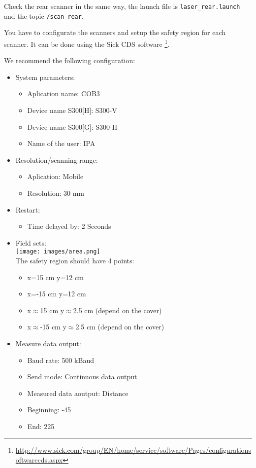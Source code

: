 Check the rear scanner in the same way, the launch file is \texttt{laser\_rear.launch} and the topic \texttt{/scan\_rear}.

You have to configurate the scanners and setup the safety region for each scanner. It can be done using the Sick CDS software \footnote{\url{http://www.sick.com/group/EN/home/service/software/Pages/configurationsoftwarecds.aspx}}.

We recommend the following configuration:
\begin{itemize}
\item System parameters:
\begin{itemize}
\item Aplication name: COB3
\item Device name S300[H]: S300-V
\item Device name S300[G]: S300-H
\item Name of the user: IPA
\end{itemize}
\item Resolution/scanning range:
\begin{itemize}
\item Aplication: Mobile
\item Resolution: 30 mm
\end{itemize}
\item Restart:
\begin{itemize}
\item Time delayed by: 2 Seconds
\end{itemize}
\item Field sets:
\\
\texttt{[image: images/area.png]}
\\ The safety region should have 4 points:
\begin{itemize}
\item x=15 cm y=12 cm
\item x=-15 cm y=12 cm
\item x$\approx$15 cm y$\approx$2.5 cm (depend on the cover)
\item x$\approx$-15 cm y$\approx$2.5 cm (depend on the cover)
\end{itemize}
\item Measure data output:
\begin{itemize}
\item Baud rate: 500 kBaud
\item Send mode: Continuous data output
\item Measured data aoutput: Distance
\item Beginning: -45
\item End: 225
\end{itemize}
\end{itemize}

